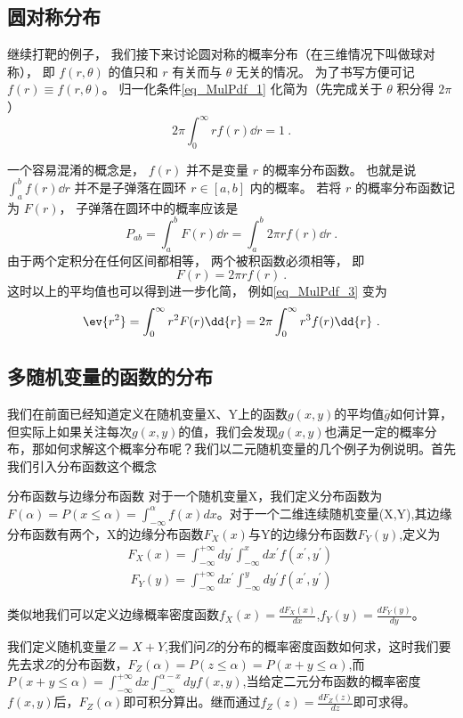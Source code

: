 
\subsection{圆对称分布}
继续打靶的例子， 我们接下来讨论圆对称的概率分布（在三维情况下叫做球对称）， 即 $f(r, \theta)$ 的值只和 $r$ 有关而与 $\theta$ 无关的情况。 为了书写方便可记 $f(r) \equiv f(r, \theta)$。 归一化条件\autoref{eq_MulPdf_1} 化简为（先完成关于 $\theta$ 积分得 $2\pi$）
\begin{equation}
2\pi \int_0^\infty r f(r) \dd{r} = 1~.
\end{equation}

一个容易混淆的概念是， $f(r)$ 并不是变量 $r$ 的概率分布函数。 也就是说 $\int_a^b f(r) \dd{r}$ 并不是子弹落在圆环 $r \in [a, b]$ 内的概率。 若将 $r$ 的概率分布函数记为 $F(r)$， 子弹落在圆环中的概率应该是
\begin{equation}\label{eq_MulPdf_4}
P_{ab} = \int_a^b F(r) \dd{r} = \int_a^b 2\pi r f(r) \dd{r}~.
\end{equation}
由于两个定积分在任何区间都相等， 两个被积函数必须相等， 即
\begin{equation}\label{eq_MulPdf_5}
F(r) = 2\pi r f(r)~.
\end{equation}
这时以上的平均值也可以得到进一步化简， 例如\autoref{eq_MulPdf_3} 变为
\begin{equation}
\ev{r^2} = \int_0^\infty r^2 F(r) \dd{r}
= 2\pi \int_0^\infty r^3 f(r) \dd{r}~.
\end{equation}
\subsection{多随机变量的函数的分布}
我们在前面已经知道定义在随机变量X、Y上的函数$g(x,y)$的平均值$\bar{g}$如何计算，但实际上如果关注每次$g(x,y)$的值，我们会发现$g(x,y)$也满足一定的概率分布，那如何求解这个概率分布呢？我们以二元随机变量的几个例子为例说明。首先我们引入分布函数这个概念
\begin{definition}{分布函数与边缘分布函数}
对于一个随机变量X，我们定义分布函数为$F(\alpha)=P(x\leq \alpha) = \int_{-\infty}^{\alpha} f(x)dx$。对于一个二维连续随机变量(X,Y),其边缘分布函数有两个，X的边缘分布函数$F_X(x)$与Y的边缘分布函数$F_Y(y)$,定义为
\begin{align}
F_X(x) = \int_{-\infty}^{+\infty} dy^\prime \int_{-\infty}^{x} dx^\prime f(x^\prime,y^\prime)\\~
F_Y(y) = \int_{-\infty}^{+\infty} dx^\prime \int_{-\infty}^y dy^\prime f(x^\prime,y^\prime)~
\end{align}
\end{definition}
类似地我们可以定义边缘概率密度函数$f_X(x) = \frac{dF_X(x)}{dx}$,$f_Y(y) = \frac{dF_Y(y)}{dy}$。
\begin{example}
我们定义随机变量$Z=X+Y$,我们问$Z$的分布的概率密度函数如何求，这时我们要先去求$Z$的分布函数，$F_Z(\alpha)=P(z\leq \alpha) = P(x+y\leq \alpha)$,而$P(x+y\leq \alpha) = \int_{-\infty}^{+\infty}dx \int_{-\infty}^{\alpha-x} dy f(x,y)$,当给定二元分布函数的概率密度$f(x,y)$后，$F_Z(\alpha)$即可积分算出。继而通过$f_Z(z) = \frac{d F_Z(z)}{dz}$即可求得。
\end{example}
